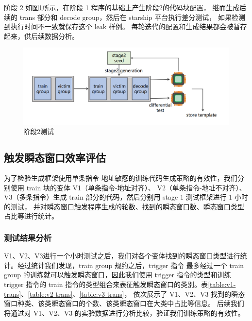 阶段 2 如图\ref{paper:stage2-test}所示，在阶段 1 程序的基础上产生阶段2的代码块配置，
继而生成后续的 trans 部分和 decode group，然后在 starship 平台执行差分测试，
如果检测到执行时间不一致就保存这个 leak 样例。
每轮迭代的配置和生成结果都会被暂存起来，供后续数据分析。\par

\begin{figure}[!h]
    \centering
    \includegraphics[width=\linewidth]{figure/paper/stage2-test.png}
    \caption{阶段2测试}
    \label{paper:stage2-test}
\end{figure}

\subsection{触发瞬态窗口效率评估}

为了检验生成框架使用单条指令-地址敏感的训练代码生成策略的有效性，我们分别使用 train 块的变体 V1（单条指令-地址对齐）、
V2（单条指令-地址不对齐）、V3（多条指令）生成 train 部分的代码，然后分别用 stage 1 测试框架进行 1 小时的测试，
并对瞬态窗口触发程序生成的轮数、找到的瞬态窗口数、瞬态窗口类型占比等进行统计。\par

\subsubsection{测试结果分析}

V1、V2、V3进行一个小时测试之后，我们对各个变体找到的瞬态窗口类型进行统计。经过统计我们发现，train group 规约之后，trigger 指令
最多经过一个 train group 的训练就可以触发瞬态窗口，因此我们使用 trigger 指令的类型和训练 trigger 指令的
train 指令的类型组合来表征触发瞬态窗口的类别。表\ref{table:v1-trans}、\ref{table:v2-trans}、\ref{table:v3-trans}，
依次展示了 V1、V2、V3 找到的瞬态窗口种类、该类瞬态窗口的个数、该类瞬态窗口在大类中占比等信息。
后续我们将通过对 V1、V2、V3 的实验数据进行分析比较，验证我们训练策略的有效性。\par

